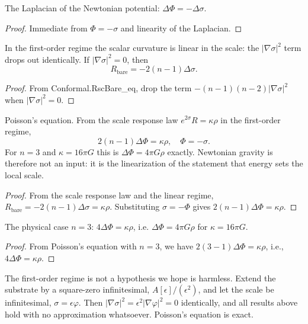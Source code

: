 \begin{theorem}
The Laplacian of the Newtonian potential: $\Delta\Phi = -\Delta\sigma$. 
\end{theorem}

\begin{proof}
Immediate from $\Phi = -\sigma$ and linearity of the Laplacian.
\end{proof}

\begin{theorem}
In the first-order regime the scalar curvature is linear in the scale: the $|\nabla\sigma|^2$ term drops out identically. If $|\nabla\sigma|^2 = 0$, then
$$R_{\text{bare}} = -2(n-1)\Delta\sigma.$$
\end{theorem}

\begin{proof}
From Conformal.RscBare\_eq, drop the term $-(n-1)(n-2)|\nabla\sigma|^2$ when $|\nabla\sigma|^2 = 0$.
\end{proof}

\begin{theorem}
Poisson's equation. From the scale response law $e^{2\sigma}R = \kappa\rho$ in the first-order regime,
$$2(n-1)\Delta\Phi = \kappa\rho, \quad \Phi = -\sigma.$$
For $n = 3$ and $\kappa = 16\pi G$ this is $\Delta\Phi = 4\pi G\rho$ exactly. Newtonian gravity is therefore not an input: it is the linearization of the statement that energy sets the local scale. 
\end{theorem}

\begin{proof}
From the scale response law and the linear regime, $R_{\text{bare}} = -2(n-1)\Delta\sigma = \kappa\rho$. Substituting $\sigma = -\Phi$ gives $2(n-1)\Delta\Phi = \kappa\rho$.
\end{proof}

\begin{theorem}
The physical case $n = 3$: $4\Delta\Phi = \kappa\rho$, i.e. $\Delta\Phi = 4\pi G\rho$ for $\kappa = 16\pi G$. 
\end{theorem}

\begin{proof}
From Poisson's equation with $n = 3$, we have $2(3-1)\Delta\Phi = \kappa\rho$, i.e., $4\Delta\Phi = \kappa\rho$.
\end{proof}

The first-order regime is not a hypothesis we hope is harmless. Extend the substrate by a square-zero infinitesimal, $A[\epsilon]/(\epsilon^2)$, and let the scale be infinitesimal, $\sigma = \epsilon\varphi$. Then $|\nabla\sigma|^2 = \epsilon^2|\nabla\varphi|^2 = 0$ identically, and all results above hold with no approximation whatsoever. Poisson's equation is exact.

